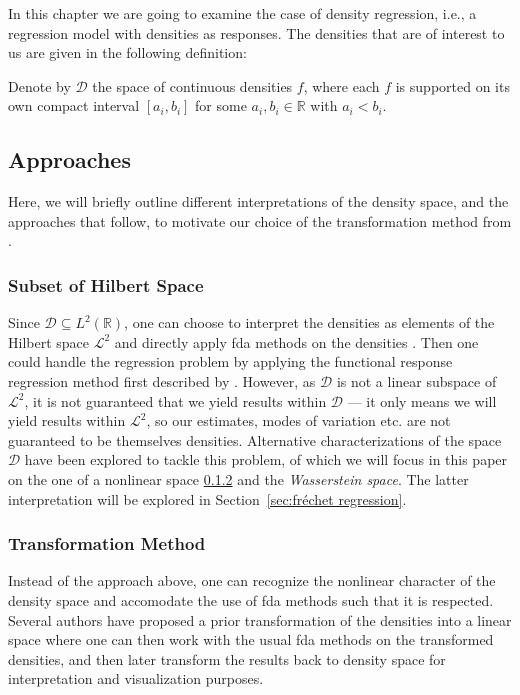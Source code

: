 In this chapter we are going to examine the case of density regression, i.e., a
regression model with densities as responses. The densities that are of interest to
us are given in the following definition:

\begin{definition}
    Denote by $\mathcal{D}$ the space of continuous densities $f$, where each
    $f$ is supported on its own compact interval $[a_i, b_i]$ for some $a_i, b_i \in
    \mathbb{R}$ with $a_i < b_i$.
\end{definition}

\subsection{Approaches}
\label{sec:approaches}
Here, we will briefly outline different interpretations of the density space, and the
approaches that follow, to motivate our choice of the transformation method from
\textcites{PetersenMüller2016}{KokoszkaEtAl2019}.

\subsubsection{Subset of Hilbert Space}
\label{sec:l2_interpretation}
Since $\mathcal{D} \subseteq L^2(\mathbb{R})$, one can choose to interpret the densities
as elements of the Hilbert space $\mathcal{L}^2$ and directly apply fda methods on the densities
\parencite[see e.g.][]{KneipUtikal2001}. Then one could handle the regression problem by
applying the functional response regression method first described by \textcite{Faraway1997}.
However, as $\mathcal{D}$ is not a linear subspace of $\mathcal{L}^2$, it is not guaranteed that
we yield results within $\mathcal{D}$ --- it only means we will yield results within $\mathcal{L}^2$,
so our estimates, modes of variation etc. are not guaranteed to be themselves densities.
Alternative characterizations of the space $\mathcal{D}$ have been explored to tackle
this problem, of which
we will focus in this paper on the one of a nonlinear space \ref{sec:transformation_interpretation}
and the \textit{Wasserstein space}. The latter interpretation will be explored in
Section~\ref{sec:fréchet regression}.

\subsubsection{Transformation Method}
\label{sec:transformation_interpretation}
Instead of the approach above, one can recognize the nonlinear character of the density
space and accomodate the use of fda methods such that it is respected. Several authors
have proposed a prior transformation of the densities into a linear space
\parencites[e.g.][]{Hron2016}[][]{PetersenMüller2016} where one can then work with the
usual fda methods on the transformed densities, and then later transform the results
back to density space for interpretation and visualization purposes.

